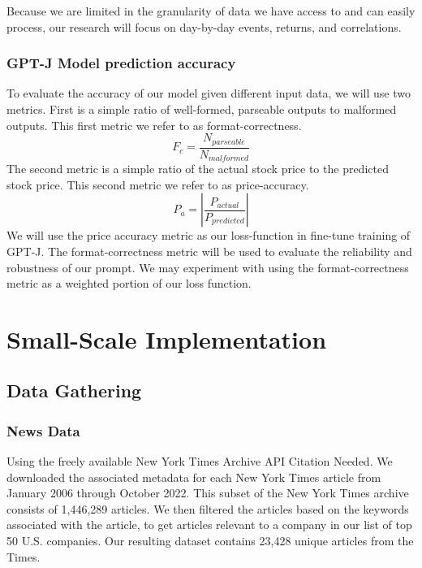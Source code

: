 \documentclass[conference]{IEEEtran}
\begin{document}
Because we are limited in the granularity of data we have access to and can easily process, our research will focus on day-by-day events, returns, and correlations.

\subsubsection{GPT-J Model prediction accuracy}
To evaluate the accuracy of our model given different input data, we will use two metrics. First is a simple ratio of well-formed, parseable outputs to malformed outputs. This first metric we refer to as format-correctness. 
\begin{equation}
	F_c=\frac{N_{parseable}}{N_{malformed}}
\end{equation}
The second metric is a simple ratio of the actual stock price to the predicted stock price. This second metric we refer to as price-accuracy.
\begin{equation}
	P_a=\left|\frac{P_{actual}}{P_{predicted}}\right|
\end{equation}
We will use the price accuracy metric as our loss-function in fine-tune training of GPT-J. The format-correctness metric will be used to evaluate the reliability and robustness of our prompt. We may experiment with using the format-correctness metric as a weighted portion of our loss function.
\section{Small-Scale Implementation}
\subsection{Data Gathering} 
\subsubsection{News Data}
Using the freely available New York Times Archive API {Citation Needed}. We downloaded the associated metadata for each New York Times article from January 2006 through October 2022. This subset of the New York Times archive consists of 1,446,289 articles. We then filtered the articles based on the keywords associated with the article, to get articles relevant to a company in our list of top 50 U.S. companies. Our resulting dataset contains 23,428 unique articles from the Times. 
\end{document}
